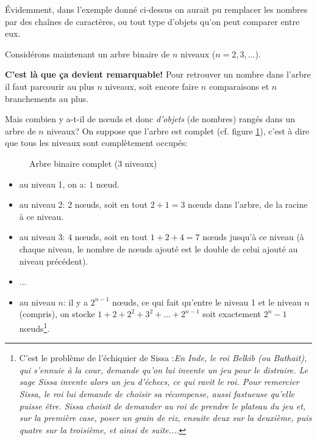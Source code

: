 Évidemment, dans l'exemple donné ci-dessus on aurait pu remplacer les
nombres par des chaînes de caractères, ou tout type d'objets qu'on
peut comparer entre eux.

Considérons maintenant un arbre binaire de $n$ niveaux ($n =
2,3,...$).

\textbf{ C'est là que ça devient remarquable!}
Pour retrouver un nombre dans l'arbre il faut parcourir au plus $n$
niveaux, soit encore faire $n$ comparaisons et $n$ branchements au
plus.

Mais combien y a-t-il de  n{\oe}uds et donc \emph{d'objets} (de nombres)
  rangés dans un 
arbre de $n$ niveaux? On suppose que l'arbre est complet (cf. figure
\ref{gcomplet}), c'est à dire que tous les niveaux sont complètement occupés:
\begin{figure}
\caption{Arbre binaire complet (3 niveaux)}\label{gcomplet}
\end{figure}

\begin{itemize}
\item au niveau 1, on a: $1$  n{\oe}ud.
\item au niveau 2: $2$  n{\oe}uds, soit en tout $2+1 =3$  n{\oe}uds
  dans l'arbre, de la racine à ce niveau.
\item au niveau 3: $4$  n{\oe}uds, soit en tout $1+ 2 +4 = 7$
  n{\oe}uds jusqu'à ce niveau (à chaque niveau, le nombre de
  n{\oe}uds ajouté est le double de celui ajouté au niveau précédent).
\item ...
\item au niveau $n$: il y a $2^{n-1}$ n{\oe}uds, ce qui fait qu'entre
  le niveau 1 et le niveau $n$ (compris), on stocke
  $1 +2 + 2^2 + 3^2+ \ldots+ 2^{n-1}$ soit   exactement $2^n - 1$
  n{\oe}uds\footnote{C'est le problème de l'échiquier de Sissa
    \cite{sissa}:\textit{\og En Inde, le roi Belkib (ou Bathait), qui
      s'ennuie à la cour, demande qu'on lui invente un jeu pour le
      distraire. Le sage Sissa invente alors un jeu d'échecs, ce qui
      ravit le roi. Pour remercier Sissa, le roi lui demande de
      choisir sa récompense, aussi fastueuse qu'elle puisse
      être. Sissa choisit de demander au roi de prendre le plateau du
      jeu et, sur la première case, poser un grain de riz, ensuite
      deux sur la deuxième, puis quatre sur la troisième, et ainsi de
      suite...\fg}.}. 
\end{itemize}

